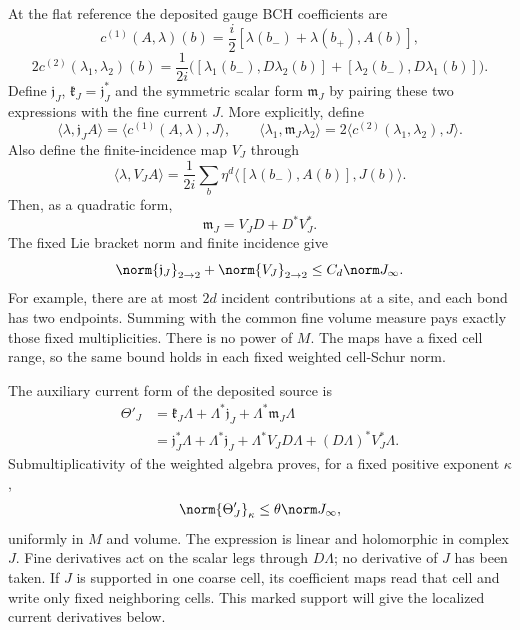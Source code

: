 At the flat reference the deposited gauge BCH coefficients are
\[
 c^{(1)}(A,\lambda)(b)
 =\frac i2[\lambda(b_-)+\lambda(b_+),A(b)],
\]
\[
 2c^{(2)}(\lambda_1,\lambda_2)(b)
 =\frac1{2i}\bigl([\lambda_1(b_-),D\lambda_2(b)]
                 +[\lambda_2(b_-),D\lambda_1(b)]\bigr).
\]
Define $\mathfrak j_J$, $\mathfrak k_J=\mathfrak j_J^*$ and
the symmetric scalar form $\mathfrak m_J$ by pairing these two
expressions with the fine current $J$. More explicitly, define
\[
 \langle\lambda,\mathfrak j_J A\rangle
   =\langle c^{(1)}(A,\lambda),J\rangle,\qquad
 \langle\lambda_1,\mathfrak m_J\lambda_2\rangle
   =2\langle c^{(2)}(\lambda_1,\lambda_2),J\rangle.
\]
Also define
the finite-incidence map $V_J$ through
\[
 \langle\lambda,V_J A\rangle
 =\frac1{2i}\sum_b\eta^d
           \langle[\lambda(b_-),A(b)],J(b)\rangle.
\]
Then, as a quadratic form,
\[
 \mathfrak m_J=V_JD+D^*V_J^*.
\]
The fixed Lie bracket norm and finite incidence give
\[
 \norm{\mathfrak j_J}_{2\to2}+\norm{V_J}_{2\to2}
 \le C_d\norm J_\infty.
\]
For example, there are at most $2d$ incident contributions at a
site, and each bond has two endpoints. Summing with the common
fine volume measure pays exactly those fixed multiplicities.
There is no power of $M$. The maps have a fixed cell range, so
the same bound holds in each fixed weighted cell-Schur norm.

The auxiliary current form of the deposited source is
\begin{equation}\label{gauge-Theta}
 \begin{split}
 \Theta'_J
 &=\mathfrak k_J\Lambda+\Lambda^*\mathfrak j_J
                    +\Lambda^*\mathfrak m_J\Lambda\\
 &=\mathfrak j_J^*\Lambda+\Lambda^*\mathfrak j_J
   +\Lambda^*V_JD\Lambda+(D\Lambda)^*V_J^*\Lambda.
 \end{split}
\end{equation}
Submultiplicativity of the weighted algebra proves, for a fixed
positive exponent $\kappa$,
\begin{equation}\label{gauge-Theta-bound}
 \norm{\Theta'_J}_\kappa\le\theta\norm J_\infty,
\end{equation}
uniformly in $M$ and volume. The expression is linear and
holomorphic in complex $J$. Fine derivatives act on the scalar
legs through $D\Lambda$; no derivative of $J$ has been taken.
If $J$ is supported in one coarse cell, its coefficient maps read
that cell and write only fixed neighboring cells. This marked
support will give the localized current derivatives below.


